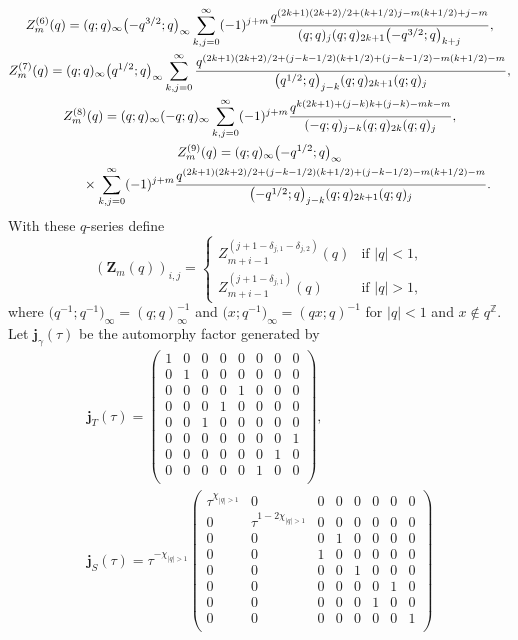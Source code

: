 \documentclass[pdftex]{sigma}
\numberwithin{equation}{section}
\def\BZ{\mathbb{Z}}
\def\BZ{\mathbb Z}
\begin{document}
\begin{gather}
 Z^{(6)}_{m}(q)
   =
 (q;q)_{\infty}\bigl(-q^{3/2};q\bigr)_{\infty}\sum_{k,j=0}^{\infty}(-1)^{j+m}\frac{q^{(2k+1)(2k+2)/2+(k+1/2)j-m(k+1/2)+j-m}}{(q;q)_{j}(q;q)_{2k+1}\bigl(-q^{3/2};q\bigr)_{k+j}},\nonumber\\
 Z^{(7)}_{m}(q)
   =
 (q;q)_{\infty}\bigl(q^{1/2};q\bigr)_{\infty}\sum_{k,j=0}^{\infty}\frac{q^{(2k+1)(2k+2)/2+(j-k-1/2)(k+1/2)+(j-k-1/2)-m(k+1/2)-m}}{\bigl(q^{1/2};q\bigr)_{j-k}(q;q)_{2k+1}(q;q)_{j}},\nonumber\\
 Z^{(8)}_{m}(q)
   =
 (q;q)_{\infty}(-q;q)_{\infty}\sum_{k,j=0}^{\infty}(-1)^{j+m}\frac{q^{k(2k+1)+(j-k)k+(j-k)-mk-m}}{(-q;q)_{j-k}(q;q)_{2k}(q;q)_{j}}, \nonumber\\
 Z^{(9)}_{m}(q)
   =
 (q;q)_{\infty}\bigl(-q^{1/2};q\bigr)_{\infty}\nonumber\\ \hphantom{Z^{(9)}_{m}(q)=}{}
 \times\sum_{k,j=0}^{\infty}(-1)^{j+m}\frac{q^{(2k+1)(2k+2)/2+(j-k-1/2)(k+1/2)+(j-k-1/2)-m(k+1/2)-m}}{\bigl(-q^{1/2};q\bigr)_{j-k}(q;q)_{2k+1}(q;q)_{j}}.
\label{eq:theqser}
\end{gather}
With these $q$-series define
\[
 (\mathbf{Z}_m(q))_{i,j}=\begin{cases} Z_{m+i-1}^{(j+1-\delta_{j,1}-\delta_{j,2})}(q) & \text{if }|q|<1 ,\\
  Z_{m+i-1}^{(j+1-\delta_{j,1})}(q) & \text{if }|q|>1 ,\end{cases}
\]
where $\bigl(q^{-1};q^{-1}\bigr)_{\infty}=(q;q)_{\infty}^{-1}$ and $\bigl(x;q^{-1}\bigr)_{\infty}=(qx;q)^{-1}$ for $|q|<1$ and $x\notin q^{\BZ}$.
Let $\mathbf{j}_{\gamma}(\tau)$ be the automorphy factor generated by
\begin{gather*}
 \mathbf{j}_{T}(\tau)
  =
 \begin{pmatrix}
 1 & 0 & 0 & 0 & 0 & 0 & 0 & 0\\
 0 & 1 & 0 & 0 & 0 & 0 & 0 & 0\\
 0 & 0 & 0 & 0 & 1 & 0 & 0 & 0\\
 0 & 0 & 0 & 1 & 0 & 0 & 0 & 0\\
 0 & 0 & 1 & 0 & 0 & 0 & 0 & 0\\
 0 & 0 & 0 & 0 & 0 & 0 & 0 & 1\\
 0 & 0 & 0 & 0 & 0 & 0 & 1 & 0\\
 0 & 0 & 0 & 0 & 0 & 1 & 0 & 0\\
 \end{pmatrix},\\
 \mathbf{j}_{S}(\tau)
  =
 \tau^{-\chi_{|q|>1}}
 \begin{pmatrix}
 \tau^{\chi_{|q|>1}} & 0 & 0 & 0 & 0 & 0 & 0 & 0\\
 0 & \tau^{1-2\chi_{|q|>1}} & 0 & 0 & 0 & 0 & 0 & 0\\
 0 & 0 & 0 & 1 & 0 & 0 & 0 & 0\\
 0 & 0 & 1 & 0 & 0 & 0 & 0 & 0\\
 0 & 0 & 0 & 0 & 1 & 0 & 0 & 0\\
 0 & 0 & 0 & 0 & 0 & 0 & 1 & 0\\
 0 & 0 & 0 & 0 & 0 & 1 & 0 & 0\\
 0 & 0 & 0 & 0 & 0 & 0 & 0 & 1\\
 \end{pmatrix}
\end{gather*}
\end{document}
